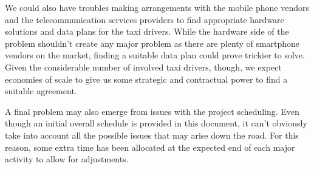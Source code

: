 We could also have troubles making arrangements with the mobile phone vendors and the telecommunication services providers to find appropriate hardware solutions and data plans for the taxi drivers. While the hardware side of the problem shouldn't create any major problem as there are plenty of smartphone vendors on the market, finding a suitable data plan could prove trickier to solve. Given the considerable number of involved taxi drivers, though, we expect economies of scale to give us some strategic and contractual power to find a suitable agreement. 

A final problem may also emerge from issues with the project scheduling. Even though an initial overall schedule is provided in this document, it can't obviously take into account all the possible issues that may arise down the road. For this reason, some extra time has been allocated at the expected end of each major activity to allow for adjustments.